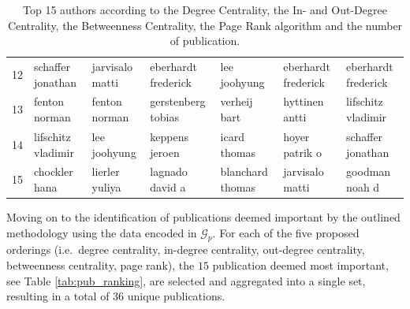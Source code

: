 \documentclass[11pt,a4paper]{book}
\theoremstyle{definition}
\theoremstyle{definition}
\theoremstyle{definition}
\theoremstyle{remark}
\newcommand{\prset}{S_{A}}
\newcommand{\pgraph}{\mathcal{G}_{p}}
\begin{document}
\begin{table}
\begin{tabular}{lllllll}
12 &      schaffer jonathan &        jarvisalo matti &    eberhardt frederick &           lee joohyung &    eberhardt frederick &    eberhardt frederick \\
13 &          fenton norman &          fenton norman &     gerstenberg tobias &           verheij bart &         hyttinen antti &     lifschitz vladimir \\
14 &     lifschitz vladimir &           lee joohyung &         keppens jeroen &           icard thomas &         hoyer patrik o &      schaffer jonathan \\
15 &          chockler hana &         lierler yuliya &        lagnado david a &       blanchard thomas &        jarvisalo matti &         goodman noah d \\
\bottomrule
\end{tabular}
\caption{Top 15 authors according to the Degree Centrality, the In- and Out-Degree Centrality, the Betweenness Centrality, the Page Rank algorithm and the number of publication.}
\label{tab:author_ranking}
\end{table}

\bigskip


Moving on to the identification of publications deemed important by the outlined methodology using the data encoded in $\pgraph$.
For each of the five proposed orderings (i.e.\ degree centrality, in-degree centrality, out-degree centrality, betweenness centrality, page rank), the $15$ publication deemed most important, see Table \ref{tab:pub_ranking}, are selected and aggregated into a single set, resulting in a total of $36$ unique publications.
\end{document}
